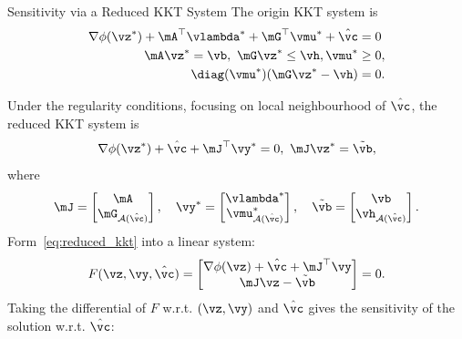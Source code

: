 \documentclass[10pt,aspectratio=169,xcolor=dvipsnames]{beamer}
\begin{document}
\begin{frame}[allowframebreaks]{Sensitivity via a Reduced KKT System}
    The origin KKT system is
    \begin{equation}
        \begin{aligned}
            \nabla \phi(\vz^*) + \mA^\top \vlambda^* + \mG^\top \vmu^* + \hat{\vc} &= 0\\
            \mA \vz^* = \vb, ~ \mG \vz^* \leq \vh , \vmu^* &\geq 0, \\~ \diag(\vmu^*) (\mG \vz^* - \vh) &= 0.
        \end{aligned}
    \end{equation}

    Under the regularity conditions, focusing on local neighbourhood of $\hat{\vc}$, the reduced KKT system is
    \begin{equation}\label{eq:reduced_kkt}
        \nabla \phi(\vz^*) + \hat{\vc} + \mJ^\top \vy^* = 0 , ~ \mJ \vz^* = \tilde{\vb},
    \end{equation}
    where
    \begin{equation}
        \mJ = \begin{bmatrix}
            \mA\\
            \mG_{\mathcal{A}(\hat{\vc})}
        \end{bmatrix},\quad
        \vy^* = \begin{bmatrix}
            \vlambda^*\\
            \vmu^*_{\mathcal{A}(\hat{\vc})}
        \end{bmatrix},\quad
        \tilde{\vb} = \begin{bmatrix}
            \vb\\
            \vh_{\mathcal{A}(\hat{\vc})}
        \end{bmatrix}.
    \end{equation}
    Form~\eqref{eq:reduced_kkt} into a linear system:
    \begin{equation}
        F(\vz, \vy, \hat{\vc}) = \begin{bmatrix}
            \nabla \phi(\vz) + \hat{\vc} + \mJ^\top \vy\\
            \mJ \vz - \tilde{\vb}
        \end{bmatrix} = 0.
    \end{equation}
    Taking the differential of $F$ w.r.t. $(\vz, \vy)$ and $\hat{\vc}$ gives the sensitivity of the solution w.r.t. $\hat{\vc}$:
    \begin{equation}\label{eq:reduced_kkt_linear}
        \boxed{
}
\end{equation}
\end{frame}
\end{document}
